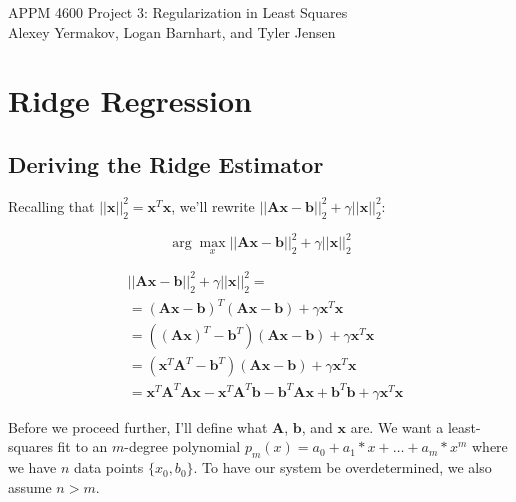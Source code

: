 \documentclass{article}
\newcommand{\x}{\mathbf{x}}
\newcommand{\A}{\mathbf{A}}
\newcommand{\B}{\mathbf{b}} %
\begin{document}
APPM 4600 Project 3: Regularization in Least Squares\\
Alexey Yermakov, Logan Barnhart, and Tyler Jensen

\section{Ridge Regression}
\subsection{Deriving the Ridge Estimator}

Recalling that $||\mathbf{x}||_{2}^{2}=\mathbf{x}^T \mathbf{x}$, we'll rewrite $||\mathbf{Ax}-\mathbf{b}||_{2}^{2} + \gamma||\mathbf{x}||_{2}^{2}$:

\begin{equation} \label{eqn:rls}
    \arg \max_{x} ||\A\x-\B||_{2}^{2} + \gamma||\x||_{2}^{2}
\end{equation}

\begin{equation*}
\begin{split}
    & ||\A\x-\B||_{2}^{2} + \gamma||\x||_{2}^{2} =\\
    & =  (\A\x - \B)^T (\A\x - \B) + \gamma \x^T \x \\ 
    & =  ((\A\x)^T - \B^T) (\A\x - \B) + \gamma \x^T \x \\ 
    & =  (\x^T\A^T - \B^T) (\A\x - \B) + \gamma \x^T \x \\ 
    & = \x^T \A^T \A\x - \x^T \A^T \B - \B^T \A\x + \B^T \B + \gamma \x^T \x
\end{split}
\end{equation*}

Before we proceed further, I'll define what $\A$, $\B$, and $\x$ are. We want a least-squares fit to an $m$-degree polynomial $p_m(x)=a_0+a_1*x+\ldots+a_m*x^m$ where we have $n$ data points $\{x_0,b_0\}$. To have our system be overdetermined, we also assume $n > m$.
\end{document}
